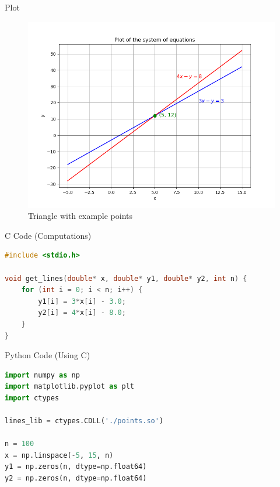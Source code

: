 \documentclass{beamer}
\begin{document}
\begin{frame}[fragile]{Plot}
\begin{figure}[H]\centering
\includegraphics[width=1\columnwidth]{figs/plt.png}
\caption{Triangle with example points}
\label{fig:plt}
\end{figure}
\end{frame}


\begin{frame}[fragile]{C Code (Computations)}
\begin{lstlisting}[language=C]
#include <stdio.h>

void get_lines(double* x, double* y1, double* y2, int n) {
    for (int i = 0; i < n; i++) {
        y1[i] = 3*x[i] - 3.0; 
        y2[i] = 4*x[i] - 8.0; 
    }
}
\end{lstlisting}
\end{frame}

\begin{frame}[fragile]{Python Code (Using C)}
\begin{lstlisting}[language=Python]
import numpy as np
import matplotlib.pyplot as plt
import ctypes

lines_lib = ctypes.CDLL('./points.so')

n = 100
x = np.linspace(-5, 15, n)
y1 = np.zeros(n, dtype=np.float64)
y2 = np.zeros(n, dtype=np.float64)
\end{lstlisting}
\end{frame}
\end{document}
